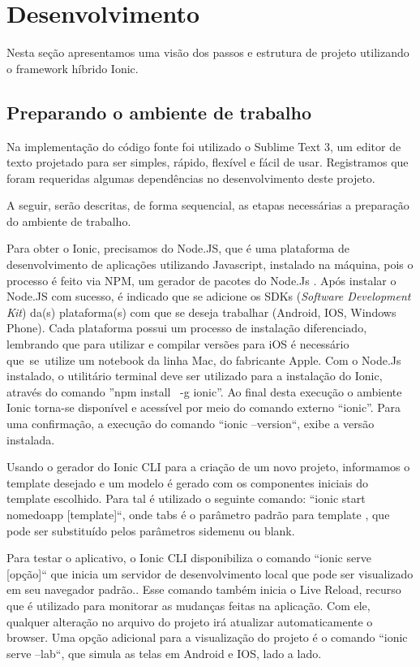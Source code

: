 \section{Desenvolvimento}
Nesta seção apresentamos uma visão dos passos e estrutura de projeto utilizando o framework híbrido Ionic. 


\subsection{Preparando o ambiente de trabalho} \label{sec:vegood:Funcionalidades}
Na implementação do código fonte foi utilizado o Sublime Text 3, um editor de texto projetado para ser simples, rápido, flexível e fácil de usar. Registramos que foram requeridas algumas dependências no desenvolvimento deste projeto. 

A seguir, serão descritas, de forma sequencial, as etapas necessárias a preparação do ambiente de trabalho.

Para obter o Ionic, precisamos do Node.JS, que é uma plataforma de desenvolvimento de aplicações utilizando Javascript, instalado na máquina, pois o processo é feito via NPM, um gerador de pacotes do Node.Js . Após instalar o Node.JS com sucesso, é indicado que se adicione os SDKs (\textit{Software Development Kit}) da(s) plataforma(s) com que se deseja trabalhar (Android, IOS, Windows Phone). Cada plataforma possui um processo de instalação diferenciado, lembrando que para utilizar e compilar versões para iOS é necessário que se utilize um notebook da linha Mac, do fabricante Apple. Com o Node.Js instalado, o utilitário terminal deve ser utilizado para a instalação do Ionic, através do comando ”npm install  -g ionic”. Ao final desta execução o ambiente Ionic torna-se disponível e acessível por meio do comando externo “ionic”. Para uma confirmação, a execução do comando “ionic --version“, exibe a versão instalada.

Usando o gerador do Ionic CLI para a criação de um novo projeto, informamos o template desejado e um modelo é gerado com os componentes iniciais do template escolhido. Para tal é utilizado o seguinte comando: “ionic start nomedoapp [template]“, onde tabs é o parâmetro padrão para template , que pode ser substituído pelos parâmetros sidemenu ou blank.

Para testar o aplicativo, o Ionic  CLI disponibiliza o comando “ionic serve [opção]“ que inicia um servidor de desenvolvimento local que pode ser visualizado em seu navegador padrão.. Esse comando também inicia o Live Reload, recurso que é utilizado para monitorar as mudanças feitas na aplicação. Com ele, qualquer alteração no arquivo do projeto irá atualizar automaticamente o browser. Uma opção adicional para a  visualização do projeto é o comando “ionic serve --lab“, que simula as telas em Android e IOS, lado a lado.

